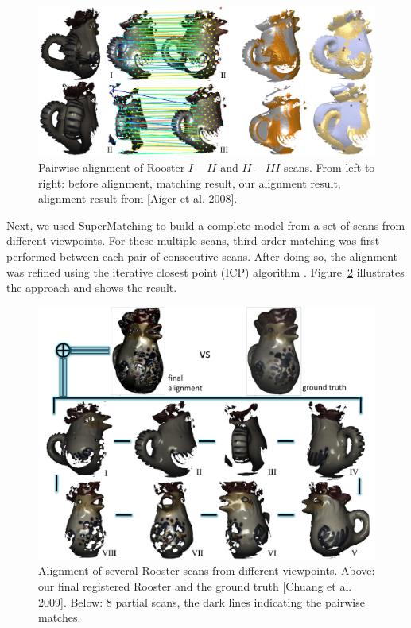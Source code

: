 \begin{figure}[t!]
\centering
  \includegraphics[width=0.99\linewidth]{figures/RoosterPair2.pdf}
  \caption{Pairwise alignment of Rooster \emph{$I-II$} and \emph{$II-III$} scans. From left to right: before alignment, matching result, our alignment result, alignment result from [Aiger et al. 2008].}
\label{fig:3DPair}
\end{figure}

Next, we used SuperMatching to build a complete model from a set of scans from different viewpoints.
For these multiple scans, third-order matching was first performed between each pair of consecutive scans.
After doing so, the alignment was refined using the iterative closest point (ICP) algorithm \cite{Besl92}.
Figure~\ref{fig:3DRigid} illustrates the approach and shows the result.

\begin{figure}[t!]
\centering
  \includegraphics[width=0.99\linewidth]{figures/Rooster.pdf}
  \caption{Alignment of several Rooster scans from different viewpoints.
  Above: our final registered Rooster and the ground truth [Chuang et al. 2009]. Below: 8 partial scans, the dark lines indicating the pairwise matches.}
\label{fig:3DRigid}
\end{figure}

